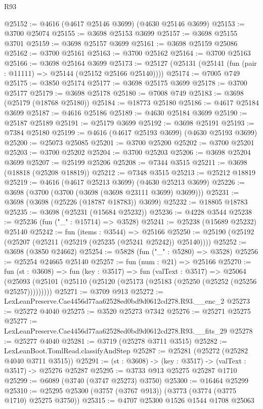 \begin{lexlean}{R93}
\begin{coremodule}
@25152 := @4616 (@4617 @25146 @3699) (@4630 @25146 @3699)
@25153 := @3700 @25074
@25155 := @3698 @25153 @3699
@25157 := @3698 @25155 @3701
@25159 := @3698 @25157 @3699
@25161 := @3698 @25159 @25086
@25162 := @3700 @25161
@25163 := @3700 @25162
@25164 := @3700 @25163
@25166 := @3698 @25164 @3699
@25173 := @25127 (@25131 (@25141 (fun (pair : @11111) => @25144 (@25152 @25166 @25140))))
@25174 := @7005 @749
@25175 := @3850 @25174
@25177 := @3698 @25175 @3699
@25178 := @3700 @25177
@25179 := @3698 @25178
@25180 := @7008 @749
@25183 := @3698 (@25179 (@18768 @25180))
@25184 := @18773 @25180
@25186 := @4617 @25184 @3699
@25187 := @4616 @25186
@25189 := @4630 @25184 @3699
@25190 := @25187 @25189
@25191 := @25179 @3699
@25192 := @3698 @25191
@25193 := @7384 @25180
@25199 := @4616 (@4617 @25193 @3699) (@4630 @25193 @3699)
@25200 := @25073 @25085
@25201 := @3700 @25200
@25202 := @3700 @25201
@25203 := @3700 @25202
@25204 := @3700 @25203
@25206 := @3698 @25204 @3699
@25207 := @25199 @25206
@25208 := @7344 @3515
@25211 := @3698 (@18818 (@25208 @18819))
@25212 := @7348 @3515
@25213 := @25212 @18819
@25219 := @4616 (@4617 @25213 @3699) (@4630 @25213 @3699)
@25226 := @3698 (@3700 (@3700 (@3698 (@3698 @23111 @3699) @3699)))
@25231 := @3698 (@3698 (@25226 (@18787 @18783)) @3699)
@25232 := @18805 @18783
@25235 := @3698 (@25231 (@15684 @25232))
@25236 := @4228 @3544
@25238 := @25236 (fun ("_" : @15714) => @3528)
@25241 := @25238 (@15689 @25232) @25140
@25242 := fun (items : @3544) => @25166
@25250 := @25190 (@25192 (@25207 (@25211 (@25219 (@25235 (@25241 @25242)) @25140))))
@25252 := @3698 (@3850 @24662)
@25254 := @5828 (fun ("_" : @5280) => @3528)
@25256 := @25254 @24665 @25140
@25257 := fun (num : @21) => @25166
@25270 := fun (st : @3608) =>
  fun (key : @3517) =>
  fun (valText : @3517) =>
  @25064 (@25093 (@25101 (@25110 (@25120 (@25173 (@25183 (@25250 (@25252 (@25256 @25257)))))))))
@25271 := @3709 @913
@25272 := LexLeanPreserve.Cae4456d77aa62528ed0bd9d0612cd278.R93.__enc_2
@25273 := @25272 @4040
@25275 := @3520 @25273 @7342
@25276 := @25271 @25275
@25277 := LexLeanPreserve.Cae4456d77aa62528ed0bd9d0612cd278.R93.__fits_29
@25278 := @25277 @4040
@25281 := @3719 (@25278 @3711 @3515)
@25282 := LexLeanBoot.TomlRead.classifyAndStep
@25287 := @25281 (@25272 (@25282 @4040 @3711 @3515))
@25291 := (st : @3608) -> (key : @3517) -> (valText : @3517) -> @25276 @25287
@25295 := @3733 @913 @25275 @25287 @1710
@25299 := @6089 (@3740 (@3747 @25273) @3750)
@25300 := @16464 @25299
@25310 := @25295 @25300 (@3757 (@3767 @913)) (@3773 (@3774 (@3775 @1710) @25275 @3750))
@25315 := @4707 @25300 @1526 @1544 @1708 @25063

\end{coremodule}
\end{lexlean}
